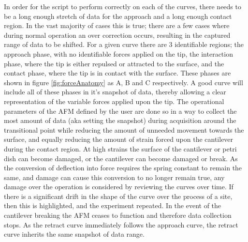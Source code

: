 
In order for the script to perform correctly on each of the curves, there needs to be a long enough stretch of data for the approach and a long enough contact region. In the vast majority of cases this is true; there are a few cases where during normal operation an over correction occurs, resulting in the captured range of data to be shifted. For a given curve there are 3 identifiable regions; the approach phase, with no identifiable forces applied on the tip, the interaction phase, where the tip is either repulsed or attracted to the surface, and the contact phase, where the tip is in contact with the surface. These phases are shown in figure \ref{fig:forceAnatomy} as A, B and C respectively. A good curve will include all of these phases in it's snapshot of data, thereby allowing a clear representation of the variable forces applied upon the tip. The operational parameters of the AFM defined by the user are done so in a way to collect the most amount of data (aka setting the snapshot) during acquisition around the transitional point while reducing the amount of unneeded movement towards the surface, and equally reducing the amount of strain forced upon the cantilever during the contact region. At high strains the surface of the cantilever or petri dish can become damaged, or the cantilever can become damaged or break. As the conversion of deflection into force requires the spring constant to remain the same, and damage can cause this conversion to no longer remain true, any damage over the operation is considered by reviewing the curves over time. If there is a significant drift in the shape of the curve over the process of a site, then this is highlighted, and the experiment repeated. In the event of the cantilever breaking the AFM ceases to function and therefore data collection stops. As the retract curve immediately follows the approach curve, the retract curve inherits the same snapshot of data range.%







